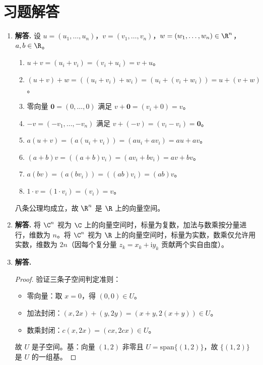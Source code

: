 \section*{习题解答}

\begin{enumerate}[label=\textbf{\arabic*.}, leftmargin=*, itemsep=1em]


\item \textbf{解答.}
设 $u=(u_1,\dots,u_n)$，$v=(v_1,\dots,v_n)$，$w=(w_1,\dots,w_n)\in\R^n$，$a,b\in\R$。
\begin{enumerate}[label=(\arabic*)]
  \item $u+v=(u_i+v_i)=(v_i+u_i)=v+u$。
  \item $(u+v)+w=((u_i+v_i)+w_i)=(u_i+(v_i+w_i))=u+(v+w)$。
  \item 零向量 $\mathbf{0}=(0,\dots,0)$ 满足 $v+\mathbf{0}=(v_i+0)=v$。
  \item $-v=(-v_1,\dots,-v_n)$ 满足 $v+(-v)=(v_i-v_i)=\mathbf{0}$。
  \item $a(u+v)=(a(u_i+v_i))=(au_i+av_i)=au+av$。
  \item $(a+b)v=((a+b)v_i)=(av_i+bv_i)=av+bv$。
  \item $a(bv)=(a(bv_i))=((ab)v_i)=(ab)v$。
  \item $1\cdot v=(1\cdot v_i)=(v_i)=v$。
\end{enumerate}
八条公理均成立，故 $\R^n$ 是 $\R$ 上的向量空间。

\item \textbf{解答.}
将 $\C^n$ 视为 $\C$ 上的向量空间时，标量为复数，加法与数乘按分量进行，维数为 $n$。将 $\C^n$ 视为 $\R$ 上的向量空间时，标量为实数，数乘仅允许用实数，维数为 $2n$（因每个复分量 $z_k=x_k+\mathrm{i}y_k$ 贡献两个实自由度）。

\item \textbf{解答.}
\begin{proof}
验证三条子空间判定准则：
\begin{itemize}
  \item 零向量：取 $x=0$，得 $(0,0)\in U$。
  \item 加法封闭：$(x,2x)+(y,2y)=(x+y,2(x+y))\in U$。
  \item 数乘封闭：$c(x,2x)=(cx,2cx)\in U$。
\end{itemize}
故 $U$ 是子空间。基：向量 $(1,2)$ 非零且 $U=\mathrm{span}\{(1,2)\}$，故 $\{(1,2)\}$ 是 $U$ 的一组基。
\end{proof}


\end{enumerate}
